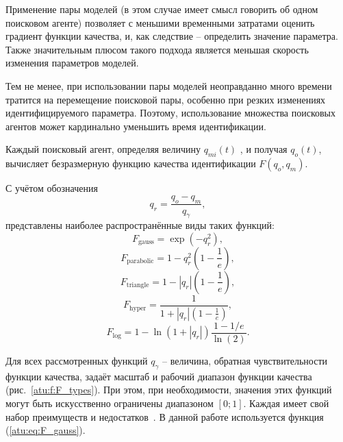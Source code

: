 \documentclass[a4paper,paratype,14pt,fouriernc]{dissatu}
\begin{document}
Применение пары моделей \cite{atu_asau3}
(в этом случае имеет смысл говорить об одном поисковом агенте)
позволяет с меньшими временными затратами оценить градиент функции качества,
и, как следствие -- определить значение параметра. Также значительным плюсом
такого подхода является меньшая скорость изменения параметров моделей.

Тем не менее, при использовании пары моделей неоправданно много времени
тратится на перемещение поисковой пары, особенно при резких изменениях
идентифицируемого параметра. Поэтому, использование множества
поисковых агентов может кардинально уменьшить время идентификации.

Каждый поисковый агент, определяя величину $q_{mi}(t)$ , и получая $q_o(t)$,
вычисляет безразмерную функцию качества идентификации
$F(q_o,q_m)$.

С учётом обозначения
%
\[
  q_r = \frac{q_o - q_m}{q_\gamma},
\]
%
\noindent
представлены наиболее распространённые виды таких функций:
%
\begin{equation}
  F_{\mathrm{gauss}} = \exp( - q_r^2 ),
\label{atu:eq:F_gauss}
\end{equation}
%
\begin{equation}
  F_{\mathrm{parabolic}} = 1 - q_r^2 \left( 1 - \frac{1}{e} \right),
\label{atu:eq:F_parabolic}
\end{equation}
%
\begin{equation}
  F_{\mathrm{triangle}} = 1 - |q_r| \left( 1 - \frac{1}{e} \right),
\label{atu:eq:F_triangle}
\end{equation}
%
\begin{equation}
  F_{\mathrm{hyper}} = \frac{1}{ 1 + |q_r| \left( 1 - \frac{1}{e} \right)},
\label{atu:eq:F_hyper}
\end{equation}
%
\begin{equation}
  F_{\mathrm{log}} = 1 - \ln \left( 1 + |q_r| \right) \frac{1-1/e}{\ln(2)}.
\label{atu:eq:F_log}
\end{equation}

Для всех рассмотренных функций $q_\gamma$ -- величина, обратная чувствительности
функции качества, задаёт масштаб и рабочий диапазон функции качества (рис.~\ref{atu:f:F_types}).
При этом, при необходимости, значения этих функций могут быть искусственно ограничены диапазоном $[0;1]$.
Каждая имеет свой набор преимуществ и недостатков~\cite{atu_ISDMCI2016}. В данной работе используется
функция (\ref{atu:eq:F_gauss}).
\end{document}
